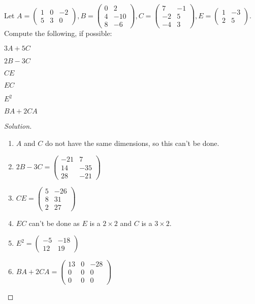 \documentclass[../main.tex]{subfiles}
\begin{document}
\begin{problem}
Let $A = \begin{pmatrix} 1 & 0 & -2 \\ 5 & 3 & 0 \end{pmatrix}, B = \begin{pmatrix} 0 & 2 \\ 4 & -10 \\ 8 & -6 \end{pmatrix}, C = \begin{pmatrix} 7 & -1 \\ -2 & 5 \\ -4 & 3 \end{pmatrix}, E = \begin{pmatrix} 1 & -3 \\ 2 & 5 \end{pmatrix}$. Compute the following, if possible:
\begin{enumerate}
\begin{multicols}{6}
\item $3A+5C$
\item $2B-3C$
\item $CE$
\item $EC$
\item $E^2$
\item $BA+2CA$
\end{multicols}
\end{enumerate}
\end{problem}
\begin{proof}[Solution]
\
\begin{enumerate}
\item $A$ and $C$ do not have the same dimensions, so this can't be done.
\item $2B - 3C = \begin{pmatrix} -21 & 7 \\ 14 & -35 \\ 28 & -21 \end{pmatrix}$
\item $CE = \begin{pmatrix} 5 & -26 \\ 8 & 31 \\ 2 & 27 \end{pmatrix}$
\item $EC$ can't be done as $E$ is a $2\times 2$ and $C$ is a $3\times 2$.
\item $E^2 = \begin{pmatrix} -5 & -18 \\ 12 & 19 \end{pmatrix}$
\item $BA + 2CA = \begin{pmatrix} 13 & 0 & -28 \\ 0 & 0 & 0 \\ 0 & 0 & 0 \end{pmatrix}$
\end{enumerate}
\end{proof}
\end{document}
